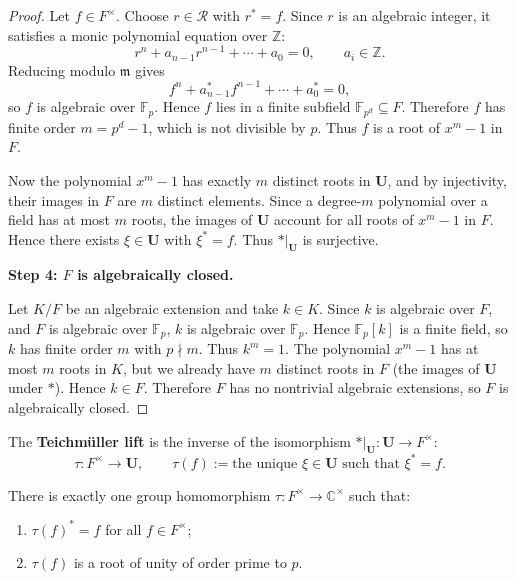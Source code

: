 \begin{proof}
Let \(f \in F^\times\). Choose \(r \in \mathcal{R}\) with \(r^* = f\). Since \(r\) is an algebraic integer, it satisfies a monic polynomial equation over \(\mathbb{Z}\):
\[
r^n + a_{n-1} r^{n-1} + \cdots + a_0 = 0, \qquad a_i \in \mathbb{Z}.
\]
Reducing modulo \(\mathfrak{m}\) gives
\[
f^n + a_{n-1}^* f^{n-1} + \cdots + a_0^* = 0,
\]
so \(f\) is algebraic over \(\mathbb{F}_p\). Hence \(f\) lies in a finite subfield \(\mathbb{F}_{p^d} \subseteq F\). Therefore \(f\) has finite order \(m = p^d - 1\), which is not divisible by \(p\). Thus \(f\) is a root of \(x^m - 1\) in \(F\).

Now the polynomial \(x^m - 1\) has exactly \(m\) distinct roots in \(\mathbf{U}\), and by injectivity, their images in \(F\) are \(m\) distinct elements. Since a degree-\(m\) polynomial over a field has at most \(m\) roots, the images of \(\mathbf{U}\) account for all roots of \(x^m - 1\) in \(F\). Hence there exists \(\xi \in \mathbf{U}\) with \(\xi^* = f\). Thus \(*|_{\mathbf{U}}\) is surjective.

\medskip
\noindent\textbf{Step 4: \(F\) is algebraically closed.}

Let \(K/F\) be an algebraic extension and take \(k \in K\). Since \(k\) is algebraic over \(F\), and \(F\) is algebraic over \(\mathbb{F}_p\), \(k\) is algebraic over \(\mathbb{F}_p\). Hence \(\mathbb{F}_p[k]\) is a finite field, so \(k\) has finite order \(m\) with \(p \nmid m\). Thus \(k^m = 1\). The polynomial \(x^m - 1\) has at most \(m\) roots in \(K\), but we already have \(m\) distinct roots in \(F\) (the images of \(\mathbf{U}\) under \(*\)). Hence \(k \in F\). Therefore \(F\) has no nontrivial algebraic extensions, so \(F\) is algebraically closed.
\end{proof}

\begin{defn}
The \textbf{Teichm\"uller lift} is the inverse of the isomorphism \(*|_{\mathbf{U}}: \mathbf{U} \to F^\times\):
\[
\tau : F^\times \longrightarrow \mathbf{U}, \qquad \tau(f) := \text{the unique } \xi \in \mathbf{U} \text{ such that } \xi^* = f.
\]
\end{defn}

\begin{thm}\label{thm:Teichmuller lift}
There is exactly one group homomorphism \(\tau: F^\times \to \mathbb{C}^\times\) such that:
\begin{enumerate}
    \item \(\tau(f)^* = f\) for all \(f \in F^\times\);
    \item \(\tau(f)\) is a root of unity of order prime to \(p\).
\end{enumerate}
\end{thm}

